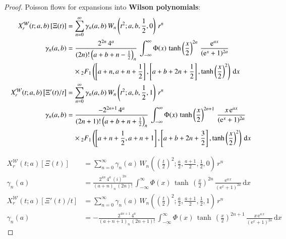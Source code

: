 \documentclass[a4paper,11pt,twoside]{amsart}
\newcommand{\verifiedeq}{=}
\newcommand{\verifiedeq}{\stackrel{\checkmark}{=}}
\begin{document}
\begin{proof}
Poisson flows for expansions into \textbf{Wilson polynomials}:
\begin{align}
X^\mathcal{W}_r(t;a,b)\left[\Xi(t)\right] &\verifiedeq \sum_{n=0}^\infty \gamma_n(a,b)\,W_n\left(t^2;a,b,\frac12,0\right)\,r^n \\
  \gamma_n(a,b) &\verifiedeq \frac{2^{2n}\,4^a}{(2n)!\left(a+b+n-\frac12\right)_n}\,\int_{-\infty}^{\infty} \Phi(x)\,\tanh\left(\frac{x}{2}\right)^{2n}\,\frac{\mathrm{e}^{ax}}{(\mathrm{e}^x+1)^{2a}}\\ &\quad \times {}_2F_1\left(\left[a+n, a+n+\frac12\right],\left[a+b+2n+\frac12\right],\tanh\left(\frac{x}{2}\right)^2\right)\,\mathrm{d}x \notag\\
X^\mathcal{W}_r(t;a,b)\left[\Xi'(t)/t\right] &\verifiedeq \sum_{n=0}^\infty \gamma_n(a,b)\,W_n\left(t^2;a,b,\frac12,1\right)\,r^n \\
  \gamma_n(a,b) &\verifiedeq \frac{-2^{2n+1}\,4^a}{(2n+1)!\left(a+b+n+\frac12\right)_n}\,\int_{-\infty}^{\infty} \Phi(x)\,\tanh\left(\frac{x}{2}\right)^{2n+1}\,\frac{x\,\mathrm{e}^{ax}}{(\mathrm{e}^x+1)^{2a}}\\ &\quad \times {}_2F_1\left(\left[a+n+\frac12, a+n+1\right],\left[a+b+2n+\frac32\right],\tanh\left(\frac{x}{2}\right)^2\right)\,\mathrm{d}x \notag
\end{align}

\begin{align}
X^\mathcal{W}_r(t;a)\left[\Xi(t)\right] &\verifiedeq \sum_{n=0}^\infty \gamma_{n}(a)\,W_{n}\left(\left(\frac{t}{2}\right)^2;\frac{a}{2},\frac{a+1}{2},\frac12,0\right)\,r^{n} \\
\gamma_n(a) &\verifiedeq \frac{2^{4n}\,4^a\,(i)^{2n}}{\left(a+n\right)_{n}\,(2n)!}\,\int_{-\infty}^{\infty} \Phi(x)\,\tanh\,\left(\frac{x}{2}\right)^{2n}\,\frac{\textrm{e}^{a\,x}}{(\textrm{e}^x+1)^{2a}}\,\mathrm{d}x \\
X^\mathcal{W}_r(t;a)\left[\Xi'(t)/t\right] &\verifiedeq \sum_{n=0}^\infty \gamma_{n}(a)\,W_{n}\left(\left(\frac{t}{2}\right)^2;\frac{a}{2},\frac{a+1}{2},\frac12,1\right)\,r^{n} \\
\gamma_n(a) &\verifiedeq -\frac{2^{4n+1}\,4^a}{\left(a+n+1\right)_{n}\,(2n+1)!}\,\int_{-\infty}^{\infty} \Phi(x)\,\tanh\,\left(\frac{x}{2}\right)^{2n+1}\,\frac{x\,\textrm{e}^{a\,x}}{(\textrm{e}^x+1)^{2a}}\,\mathrm{d}x
\end{align}


\end{proof}
\end{document}
